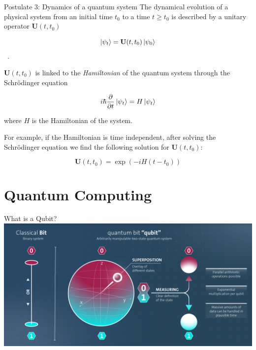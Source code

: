 \documentclass[11p,aspectratio=169]{beamer}
\begin{document}
\begin{frame}{Postulate 3: Dynamics of a quantum system}
    The dynamical evolution of a physical system  from an 
    initial time $t_0$ to a time $t \ge t_0$ is described by a 
    unitary operator $\textbf{U}(t, t_0)$

    $$\ket{\psi_t} = \textbf{U}(t, t_0) \ket{\psi_0}$$ \ .

    $\textbf{U}(t, t_0)$ is linked to the \emph{Hamiltonian} of the quantum system through the
    Schr\"{o}dinger equation

    $$ i \hbar \frac{\partial}{\partial t} \ket{\psi_t} = H \ket{\psi_t}$$

    where $H$ is the Hamiltonian of the system.

    For example, if the Hamiltonian is time independent, after solving the 
    Schr\"{o}dinger equation we find the following solution for $\textbf{U}(t, t_0)$:

    $$ \textbf{U}(t, t_0) = \exp(- i H (t -t_0))$$


    
\end{frame}

\section{Quantum Computing}

\begin{frame}{What is a Qubit?}
    \includegraphics[width=\textwidth]{figures/qubits.png}
\end{frame}
\end{document}

